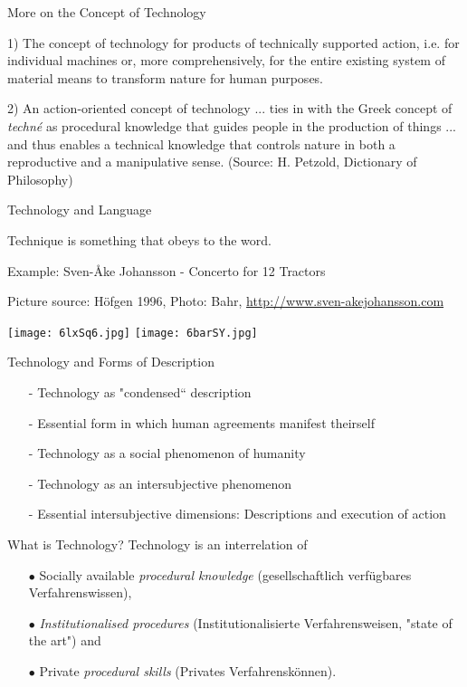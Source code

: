 \documentclass{beamer}
\begin{document}
\begin{frame}{More on the Concept of Technology}

1) The concept of technology for products of technically supported action,
i.e. for individual machines or, more comprehensively, for the entire existing
system of material means to transform nature for human purposes.

2) An action-oriented concept of technology ... ties in with the Greek concept
of \emph{techné} as procedural knowledge that guides people in the production
of things ... and thus enables a technical knowledge that controls nature in
both a reproductive and a manipulative sense. (Source: H. Petzold, Dictionary
of Philosophy)

\end{frame}

\begin{frame}{Technology and Language}

Technique is something that obeys to the word.

Example: Sven-Åke Johansson - Concerto for 12 Tractors

Picture source: Höfgen 1996, Photo: Bahr,
\url{http://www.sven-akejohansson.com}

\begin{center}
  \texttt{[image: 6lxSq6.jpg]}\hfill
  \texttt{[image: 6barSY.jpg]}
\end{center}

\end{frame}

\begin{frame}{Technology and Forms of Description}
  \begin{itemize}
  \item[-] Technology as "condensed“ description
  \item[-] Essential form in which human agreements manifest theirself
  \item[-] Technology as a social phenomenon of humanity
  \item[-] Technology as an intersubjective phenomenon
  \item[-] Essential intersubjective dimensions: Descriptions and execution of
    action
  \end{itemize}
  \begin{block}{What is Technology?} 
    Technology is an interrelation of
    \begin{itemize}
    \item[$\bullet$] Socially available \emph{procedural knowledge}
      (gesellschaftlich verfügbares Verfahrenswissen), 
    \item[$\bullet$] \emph{Institutionalised procedures} (Institutionalisierte
      Verfahrens\-weisen, "state of the art") and
    \item[$\bullet$] Private \emph{procedural skills} (Privates
      Verfahrenskönnen).
    \end{itemize}
  \end{block}
\end{frame}
\end{document}
